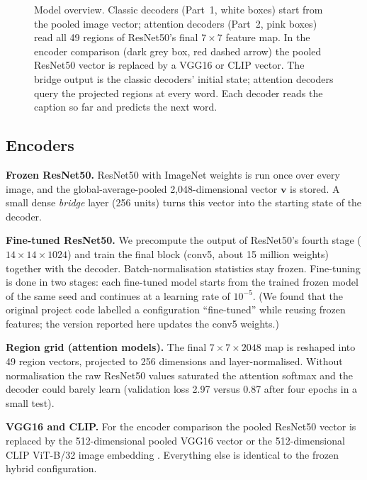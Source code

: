 \documentclass[11pt]{article}
\begin{document}
\begin{figure}[tbp]
{}
\caption{Model overview. Classic decoders (Part~1, white boxes) start from the pooled image vector; attention decoders (Part~2, pink boxes) read all 49 regions of ResNet50's final $7\times7$ feature map. In the encoder comparison (dark grey box, red dashed arrow) the pooled ResNet50 vector is replaced by a VGG16 or CLIP vector. The bridge output is the classic decoders' initial state; attention decoders query the projected regions at every word. Each decoder reads the caption so far and predicts the next word.}
\label{fig:arch}
\end{figure}

\subsection{Encoders}
\textbf{Frozen ResNet50.} ResNet50 \cite{he2016} with ImageNet weights is run once over every image, and the global-average-pooled 2,048-dimensional vector $\mathbf{v}$ is stored. A small dense \emph{bridge} layer (256 units) turns this vector into the starting state of the decoder.

\textbf{Fine-tuned ResNet50.} We precompute the output of ResNet50's fourth stage ($14\times14\times1024$) and train the final block (conv5, about 15 million weights) together with the decoder. Batch-normalisation statistics stay frozen. Fine-tuning is done in two stages: each fine-tuned model starts from the trained frozen model of the same seed and continues at a learning rate of $10^{-5}$. (We found that the original project code labelled a configuration ``fine-tuned'' while reusing frozen features; the version reported here updates the conv5 weights.)

\textbf{Region grid (attention models).} The final $7\times7\times2048$ map is reshaped into 49 region vectors, projected to 256 dimensions and layer-normalised. Without normalisation the raw ResNet50 values saturated the attention softmax and the decoder could barely learn (validation loss 2.97 versus 0.87 after four epochs in a small test).

\textbf{VGG16 and CLIP.} For the encoder comparison the pooled ResNet50 vector is replaced by the 512-dimensional pooled VGG16 \cite{simonyan2015} vector or the 512-dimensional CLIP ViT-B/32 image embedding \cite{radford2021}. Everything else is identical to the frozen hybrid configuration.
\end{document}
